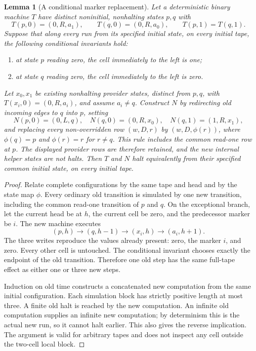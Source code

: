 \documentclass[11pt]{article}
\newtheorem{lemma}[theorem]{Lemma}
\theoremstyle{definition}\newtheorem{definition}[theorem]{Definition}
\theoremstyle{remark}\newtheorem{remark}[theorem]{Remark}
\begin{document}
\begin{lemma}[A conditional marker replacement]\label{lem:marker}
Let a deterministic binary machine $T$ have distinct noninitial,
nonhalting states $p,q$ with
\[
 T(p,0)=(0,R,a_1),\qquad T(q,0)=(0,R,a_0),\qquad
 T(p,1)=T(q,1).
\]
Suppose that along every run from its specified initial state, on every
initial tape, the following conditional invariants hold:
\begin{enumerate}
\item at state $p$ reading zero, the cell immediately to the left is one;
\item at state $q$ reading zero, the cell immediately to the left is zero.
\end{enumerate}
Let $x_0,x_1$ be existing nonhalting provider states, distinct from $p,q$,
with $T(x_i,0)=(0,R,a_i)$, and assume $a_i\ne q$.
Construct $N$ by redirecting old incoming edges to
$q$ into $p$, setting
\[
 N(p,0)=(0,L,q),\quad
 N(q,0)=(0,R,x_0),\quad N(q,1)=(1,R,x_1),
\]
and replacing every non-overridden row $(w,D,r)$ by $(w,D,\phi(r))$,
where $\phi(q)=p$ and $\phi(r)=r$ for $r\ne q$.
This rule includes the common read-one row at $p$.
The displayed provider rows are therefore retained, and the new internal
helper states are not halts.
Then $T$ and $N$ halt equivalently from their specified common initial
state, on every initial tape.
\end{lemma}

\begin{proof}
Relate complete configurations by the same tape and head and by the state
map $\phi$. Every ordinary old transition is simulated by one new
transition, including the common read-one transition of $p$ and $q$.
On the exceptional branch, let the current head be at $h$, the current
cell be zero, and the predecessor marker be $i$. The new machine executes
\[
 (p,h)\longrightarrow(q,h-1)\longrightarrow(x_i,h)
              \longrightarrow(a_i,h+1).
\]
The three writes reproduce the values already present: zero, the marker
$i$, and zero. Every other cell is untouched. The conditional invariant
chooses exactly the endpoint of the old transition. Therefore one old
step has the same full-tape effect as either one or three new steps.

Induction on old time constructs a concatenated new computation from the
same initial configuration. Each simulation block has strictly positive
length at most three. A finite old halt is reached by the new computation.
An infinite old computation supplies an infinite new computation; by
determinism this is the actual new run, so it cannot halt earlier. This
also gives the reverse implication. The argument is valid for arbitrary
tapes and does not inspect any cell outside the two-cell local block.
\end{proof}
\end{document}
